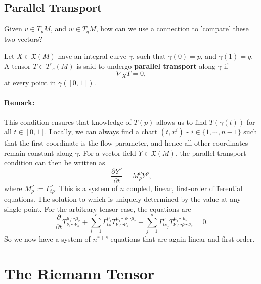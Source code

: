 \documentclass[11pt,fleqn]{report}
\begin{document}
\subsection{Parallel Transport}
Given $v \in T_pM$, and $w \in T_qM$, how can we use a connection to 'compare' these two vectors?

\begin{definition}
	Let $X\in \mathfrak{X}(M)$ have an integral curve $\gamma$, such that $\gamma(0)=p$, and $\gamma(1)=q$. A tensor $T \in T^r_{\phantom r s}(M)$ is said to undergo \textbf{parallel transport} along $\gamma$ if 
	\begin{equation}
		\nabla_X T = 0,
	\end{equation}
	at every point in $\gamma([0,1])$.
\end{definition}

\paragraph{Remark:} This condition ensures that knowledge of $T(p)$ allows us to find $T(\gamma(t))$ for all $t \in [0,1]$. Locally, we can always find a chart $(t,x^i)$ - $i \in \{1,\cdots,n-1\}$ such that the first coordinate is the flow parameter, and hence all other coordinates remain constant along $\gamma$. For a vector field $Y \in \mathfrak{X}(M)$, the parallel transport condition can then be written as
	\begin{equation}
		\frac{\partial Y^\nu}{\partial t} = M^\nu_\rho Y^\rho,
	\end{equation}
where $M^\nu_\rho := \Gamma_{t\rho}^\nu$. This is a system of $n$ coupled, linear, first-order differential equations. The solution to which is uniquely determined by the value at any single point. For the arbitrary tensor case, the equations are
	\begin{equation}
		\frac{\partial }{\partial t}T^{\mu_1\cdots\mu_r}_{\nu_1 \cdots \nu_s} + \sum_{i=1}^r \Gamma_{t\rho}^{\mu_i}T^{\mu_1\cdots\rho\cdots\mu_r}_{\nu_1 \cdots \nu_s} - \sum_{j=1}^s \Gamma_{t\nu_j}^{\rho}T^{\mu_1\cdots\mu_r}_{\nu_1 \cdots\rho\cdots \nu_s} = 0.
	\end{equation}
So we now have a system of $n^{r+s}$ equations that are again linear and first-order.

\section{The Riemann Tensor}
\end{document}
